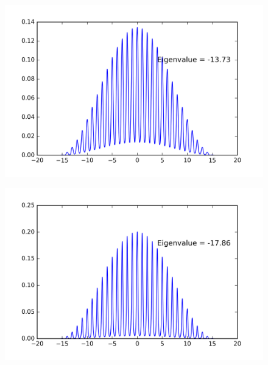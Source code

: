 \begin{figure}[!htbh]
\centering
\begin{minipage}{.45\textwidth}
  \centering
  \includegraphics[width=1.1\linewidth]{floatingPrecision/oldPot100discrete_1th_Lowest0_5.png}
  \label{fig:oldPo_0.5}
\end{minipage}\qquad
\begin{minipage}{.45\textwidth}
  \centering
  \includegraphics[width=1.1\linewidth]{floatingPrecision/newPot100discrete_1th_Lowest0_3.png}
  \label{fig:newPo_0.3}
\end{minipage}
\end{figure}

